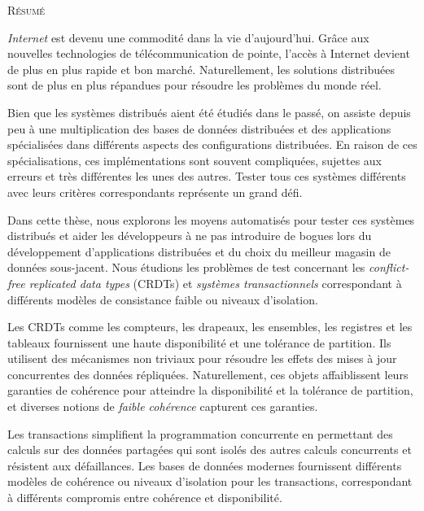 
\begin{center}
  \textsc{Résumé}
\end{center}
%
\noindent
%


\emph{Internet} est devenu une commodité dans la vie d'aujourd'hui. Grâce aux nouvelles technologies de télécommunication de pointe, l'accès à Internet devient de plus en plus rapide et bon marché. Naturellement, les solutions distribuées sont de plus en plus répandues pour résoudre les problèmes du monde réel. 

Bien que les systèmes distribués aient été étudiés dans le passé, on assiste depuis peu à une multiplication des bases de données distribuées et des applications spécialisées dans différents aspects des configurations distribuées. En raison de ces spécialisations, ces implémentations sont souvent compliquées, sujettes aux erreurs et très différentes les unes des autres. Tester tous ces systèmes différents avec leurs critères correspondants représente un grand défi.

Dans cette thèse, nous explorons les moyens automatisés pour tester ces systèmes distribués et aider les développeurs à ne pas introduire de bogues lors du développement d'applications distribuées et du choix du meilleur magasin de données sous-jacent. Nous étudions les problèmes de test concernant les \emph{conflict-free replicated data types} (CRDTs) et \emph{systèmes transactionnels} correspondant à différents modèles de consistance faible ou niveaux d'isolation.

Les CRDTs comme les compteurs, les drapeaux, les ensembles, les registres et les tableaux fournissent une haute disponibilité et une tolérance de partition. Ils utilisent des mécanismes non triviaux pour résoudre les effets des mises à jour concurrentes des données répliquées. Naturellement, ces objets affaiblissent leurs garanties de cohérence pour atteindre la disponibilité et la tolérance de partition, et diverses notions de \emph{faible cohérence} capturent ces garanties.

Les transactions simplifient la programmation concurrente en permettant des calculs sur des données partagées qui sont isolés des autres calculs concurrents et résistent aux défaillances. Les bases de données modernes fournissent différents modèles de cohérence ou niveaux d'isolation pour les transactions, correspondant à différents compromis entre cohérence et disponibilité.


